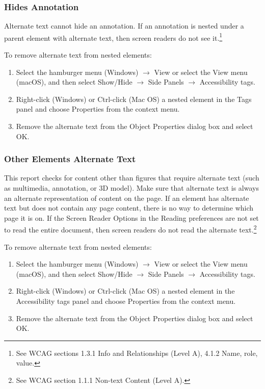 \subsubsection*{Hides Annotation}
Alternate text cannot hide an annotation. If an annotation is nested under a parent element with alternate text, then screen readers do not see it.\footnote{See WCAG sections 1.3.1 Info and Relationships (Level A), 4.1.2 Name, role, value.}

To remove alternate text from nested elements:
\begin{enumerate}
    \item Select the hamburger menu (Windows) $\rightarrow$ View or select the View menu (macOS), and then select Show/Hide $\rightarrow$ Side Panels $\rightarrow$ Accessibility tags.
    \item Right-click (Windows) or Ctrl-click (Mac OS) a nested element in the Tags panel and choose Properties from the context menu.
    \item Remove the alternate text from the Object Properties dialog box and select OK.
\end{enumerate}

\subsubsection*{Other Elements Alternate Text}
This report checks for content other than figures that require alternate text (such as multimedia, annotation, or 3D model). Make sure that alternate text is always an alternate representation of content on the page. If an element has alternate text but does not contain any page content, there is no way to determine which page it is on. If the Screen Reader Options in the Reading preferences are not set to read the entire document, then screen readers do not read the alternate text.\footnote{See WCAG section 1.1.1 Non-text Content (Level A).}

To remove alternate text from nested elements:
\begin{enumerate}
    \item Select the hamburger menu (Windows) $\rightarrow$ View or select the View menu (macOS), and then select Show/Hide $\rightarrow$ Side Panels $\rightarrow$ Accessibility tags.
    \item Right-click (Windows) or Ctrl-click (Mac OS) a nested element in the Accessibility tags panel and choose Properties from the context menu.
    \item Remove the alternate text from the Object Properties dialog box and select OK.
\end{enumerate}
